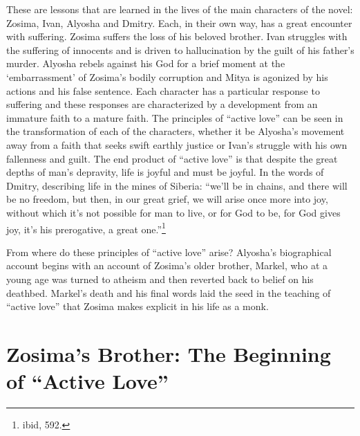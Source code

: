 These are lessons that are learned in the lives of the main characters of the novel: Zosima, Ivan, Alyosha and Dmitry. Each, in their own way, has a great encounter with suffering. Zosima suffers the loss of his beloved brother. Ivan struggles with the suffering of innocents and is driven to hallucination by the guilt of his father's murder. Alyosha rebels against his God for a brief moment at the `embarrassment' of Zosima's bodily corruption and Mitya is agonized by his actions and his false sentence. Each character has a particular response to suffering and these responses are characterized by a development from an immature faith to a mature faith. The principles of ``active love'' can be seen in the transformation of each of the characters, whether it be Alyosha's movement away from a faith that seeks swift earthly justice or Ivan's struggle with his own fallenness and guilt. The end product of ``active love'' is that despite the great depths of man's depravity, life is joyful and must be joyful. In the words of Dmitry, describing life in the mines of Siberia: ``we'll be in chains, and there will be no freedom, but then, in our great grief, we will arise once more into joy, without which it's not possible for man to live, or for God to be, for God gives joy, it's his prerogative, a great one.''\footnote{ibid, 592.}

From where do these principles of ``active love'' arise? Alyosha's biographical account begins with an account of Zosima's older brother, Markel, who at a young age was turned to atheism and then reverted back to belief on his deathbed. Markel's death and his final words laid the seed in the teaching of ``active love'' that Zosima makes explicit in his life as a monk.

	\section{Zosima's Brother: The Beginning of ``Active Love''}
	
